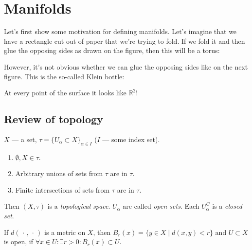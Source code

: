 \pagebreak
\section{Manifolds}
Let's first show some motivation for defining manifolds.
Let's imagine that we have a rectangle cut out of paper that we're trying to fold.
If we fold it and then glue the opposing sides as drawn on the figure, then this will be a torus:

\begin{figure*}[h]
    \centering
    \qquad
\end{figure*}

However, it's not obvious whether we can glue the opposing sides like on the next figure.
This is the so-called Klein bottle:

\begin{figure*}[h]
    \centering
    \qquad
\end{figure*}

At every point of the surface it looks like $\mathbb{R}^2$!

\subsection{Review of topology}
\begin{definition}
    $X$ --- a set, $\tau = \{U_\alpha \subset X\}_{\alpha \in I}$
    ($I$ --- some index set).
    \begin{enumerate}
        \item {
            $\emptyset, X \in \tau$.
        }
        \item {
            Arbitrary unions of sets from $\tau$ are in $\tau$.
        }
        \item {
            Finite intersections of sets from $\tau$ are in $\tau$.
        }
    \end{enumerate}
    Then $(X, \tau)$ is a \textit{topological space}.
    $U_\alpha$ are called \textit{open sets}. Each $U_\alpha^C$ is a \textit{closed set}.
\end{definition}
\begin{example}
    If $d(\, \cdot\, , \, \cdot \,)$ is a metric on $X$, then 
    $B_r(x) = \{y \in X \mid d(x, y) < r\}$ and $U \subset X$ is open, 
    if $\forall x \in U: \exists r > 0: B_r(x) \subset U$.
\end{example}

